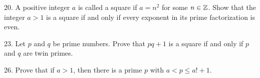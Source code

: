 \begin{mdframed}[style=darkAnswer,frametitle={Joe Starr}]
    
\end{mdframed}
\newpage
\begin{mdframed}[style=darkQuesion]
20. A positive integer $a$ is called a square if $a=n^2$ for some $n\in \mathbb{Z}$. 
Show that the integer $a>1$ is a square if and only if every exponent in its 
prime factorization is even. 
\end{mdframed}

\begin{mdframed}[style=darkAnswer,frametitle={Joe Starr}]
    
\end{mdframed}
\newpage
\begin{mdframed}[style=darkQuesion]
23. Let $p$ and $q$ be prime numbers. Prove that $pq+1$ is a square if and only 
if $p$ and $q$ are twin primes.
\end{mdframed}

\begin{mdframed}[style=darkAnswer,frametitle={Joe Starr}]
    
\end{mdframed}
\newpage
\begin{mdframed}[style=darkQuesion]
26. Prove that if $a>1$, then there is a prime $p$ with $a<p\leq a!+1$.
\end{mdframed}

